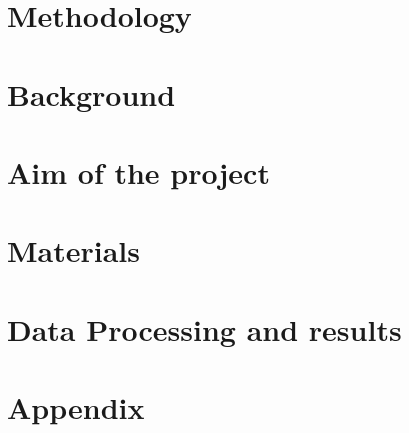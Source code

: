 

\raggedbottom %



\frontmatter	 %


\newpage
\clearpage

\newpage

\tableofcontents*												%

\mainmatter
\chapter{Methodology}


\chapter{Background} 




\chapter{Aim of the project}


\chapter{Materials}





\chapter{Data Processing and results}


\begingroup
\raggedright



%
%

\endgroup

\appendix
\chapter{Appendix}


